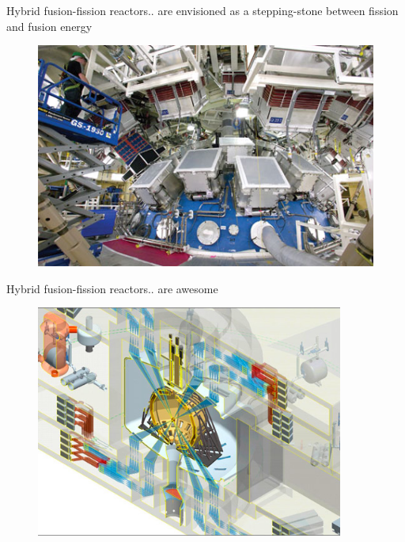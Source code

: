 \documentclass{beamer}
\begin{document}
        \begin{frame}{Hybrid fusion-fission reactors}{.. are envisioned as a stepping-stone between fission and fusion energy}
            \begin{figure}
                \centering
                \includegraphics[width=1.0\textwidth]{./img/nifChamber.png}
                \caption*{}
            \end{figure}
        \end{frame}

        \begin{frame}{Hybrid fusion-fission reactors}{.. are awesome}
            \begin{figure}
                \centering
                \includegraphics[width=0.9\textwidth]{./img/lifeChamber.png}
                \caption*{}
            \end{figure}
        \end{frame}
\end{document}
